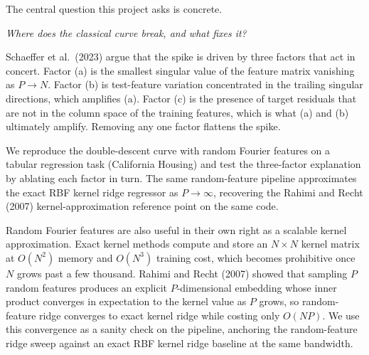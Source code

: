 \documentclass{article}
\begin{document}
The central question this project asks is concrete.

\begin{center}
\emph{Where does the classical curve break, and what fixes it?}
\end{center}

Schaeffer et al.\ (2023) argue that the spike is driven by three factors that act in concert. Factor (a) is the smallest singular value of the feature matrix vanishing as $P \to N$. Factor (b) is test-feature variation concentrated in the trailing singular directions, which amplifies (a). Factor (c) is the presence of target residuals that are not in the column space of the training features, which is what (a) and (b) ultimately amplify. Removing any one factor flattens the spike.

We reproduce the double-descent curve with random Fourier features on a tabular regression task (California Housing) and test the three-factor explanation by ablating each factor in turn. The same random-feature pipeline approximates the exact RBF kernel ridge regressor as $P \to \infty$, recovering the Rahimi and Recht (2007) kernel-approximation reference point on the same code.

Random Fourier features are also useful in their own right as a scalable kernel approximation. Exact kernel methods compute and store an $N \times N$ kernel matrix at $O(N^2)$ memory and $O(N^3)$ training cost, which becomes prohibitive once $N$ grows past a few thousand. Rahimi and Recht (2007) showed that sampling $P$ random features produces an explicit $P$-dimensional embedding whose inner product converges in expectation to the kernel value as $P$ grows, so random-feature ridge converges to exact kernel ridge while costing only $O(NP)$. We use this convergence as a sanity check on the pipeline, anchoring the random-feature ridge sweep against an exact RBF kernel ridge baseline at the same bandwidth.
\end{document}

